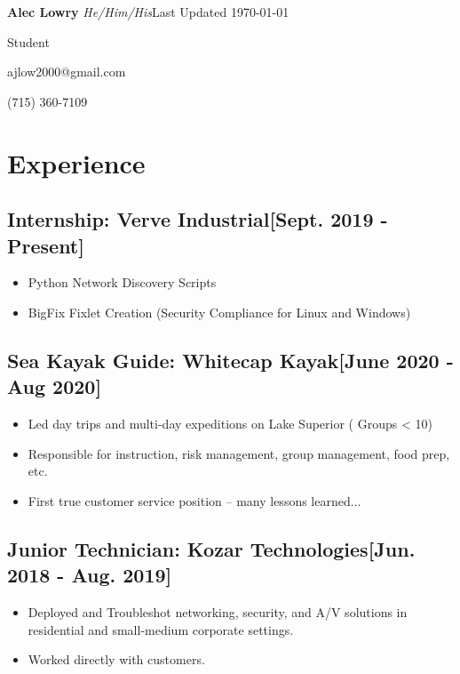 \documentclass{article}
\begin{document}
\textbf{Alec Lowry} \emph{He/Him/His}\hfill{Last Updated \today}

Student%

ajlow2000@gmail.com

(715) 360-7109

\section{Experience}

    \subsection{\textbf{Internship}: Verve Industrial\hfill[Sept. 2019 - Present]}
        \begin{itemize}
            \item Python Network Discovery Scripts
            \item BigFix Fixlet Creation (Security Compliance for Linux and Windows)
        \end{itemize}

    \subsection{\textbf{Sea Kayak Guide}: Whitecap Kayak\hfill[June 2020 - Aug 2020]}
        \begin{itemize}
            \item Led day trips and multi-day expeditions on Lake Superior ( Groups < 10)
            \item Responsible for instruction, risk management, group management, food prep, etc.
            \item First true customer service position -- many lessons learned...
        \end{itemize}

    \subsection{\textbf{Junior Technician}: Kozar Technologies\hfill[Jun. 2018 - Aug. 2019]}
        \begin{itemize}
            \item Deployed and Troubleshot networking, security, and A/V solutions in residential and small-medium corporate settings.
            \item Worked directly with customers.
        \end{itemize}
\end{document}
